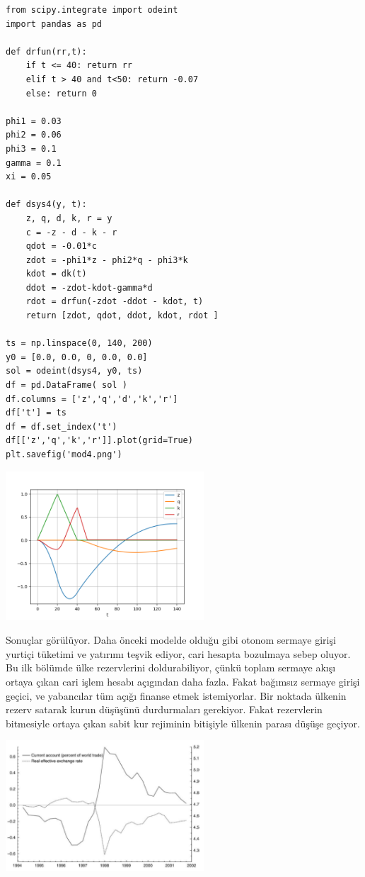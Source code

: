 \documentclass[12pt,fleqn]{article}\usepackage{../../common}
\begin{document}
\begin{verbatim}
from scipy.integrate import odeint
import pandas as pd

def drfun(rr,t):
    if t <= 40: return rr
    elif t > 40 and t<50: return -0.07
    else: return 0

phi1 = 0.03
phi2 = 0.06
phi3 = 0.1
gamma = 0.1
xi = 0.05

def dsys4(y, t):
    z, q, d, k, r = y
    c = -z - d - k - r
    qdot = -0.01*c
    zdot = -phi1*z - phi2*q - phi3*k
    kdot = dk(t) 
    ddot = -zdot-kdot-gamma*d
    rdot = drfun(-zdot -ddot - kdot, t)
    return [zdot, qdot, ddot, kdot, rdot ]

ts = np.linspace(0, 140, 200)
y0 = [0.0, 0.0, 0, 0.0, 0.0]
sol = odeint(dsys4, y0, ts)
df = pd.DataFrame( sol )
df.columns = ['z','q','d','k','r']
df['t'] = ts
df = df.set_index('t')
df[['z','q','k','r']].plot(grid=True)
plt.savefig('mod4.png')
\end{verbatim}

\includegraphics[width=20em]{mod4.png}

Sonuçlar görülüyor. Daha önceki modelde olduğu gibi otonom sermaye girişi
yurtiçi tüketimi ve yatırımı teşvik ediyor, cari hesapta bozulmaya sebep
oluyor. Bu ilk bölümde ülke rezervlerini doldurabiliyor, çünkü toplam
sermaye akışı ortaya çıkan cari işlem hesabı açıgından daha fazla. Fakat
bağımsız sermaye girişi geçici, ve yabancılar tüm açığı finanse etmek
istemiyorlar. Bir noktada ülkenin rezerv satarak kurun düşüşünü
durdurmaları gerekiyor. Fakat rezervlerin bitmesiyle ortaya çıkan sabit kur
rejiminin bitişiyle ülkenin parası düşüşe geçiyor.

\includegraphics[width=20em]{crisis.png}
\end{document}
